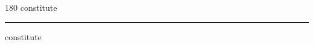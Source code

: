 
\begin{frame}
\begin{center}
\begin{turn}{180}
{\fontsize{2.5cm}{1em}\selectfont constitute}
\end{turn}
\vspace{1em}\par  
\hrule
\vspace{1em}\par  
{\fontsize{2.5cm}{1em}\selectfont constitute}
\end{center}
\end{frame}

